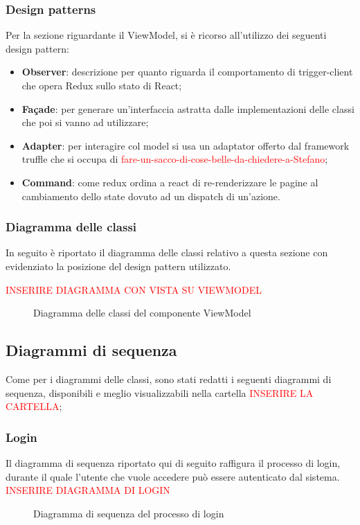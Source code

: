 		\subsubsection{Design patterns}
		Per la sezione riguardante il ViewModel, si è ricorso all'utilizzo dei seguenti design pattern:
			\begin{itemize}
				\item \textbf{Observer}: descrizione per quanto riguarda il comportamento di trigger-client che opera Redux sullo stato di React;
				\item \textbf{Façade}: per generare un'interfaccia astratta dalle implementazioni delle classi che poi si vanno ad utilizzare;
				\item \textbf{Adapter}: per interagire col model si usa un adaptator offerto dal framework truffle che si occupa di {\textcolor{red}{fare-un-sacco-di-cose-belle-da-chiedere-a-Stefano}};
				\item \textbf{Command}: come redux ordina a react di re-renderizzare le pagine al cambiamento dello state dovuto ad un dispatch di un'azione.
			\end{itemize}
	
		\subsubsection{Diagramma delle classi}
		In seguito è riportato il diagramma delle classi relativo a questa sezione con evidenziato la posizione del design pattern utilizzato.
	
	{\textcolor{red}{INSERIRE DIAGRAMMA CON VISTA SU VIEWMODEL}}
	\begin{figure}[h]
		\centering
		\caption{Diagramma delle classi del componente ViewModel}
		\label{}
	\end{figure}
	
	\subsection{Diagrammi di sequenza}
	Come per i diagrammi delle classi, sono stati redatti i seguenti diagrammi di sequenza, disponibili e meglio visualizzabili nella cartella {\textcolor{red}{INSERIRE LA CARTELLA}};
	
		\subsubsection{Login}
		Il diagramma di sequenza riportato qui di seguito raffigura il processo di login, durante il quale l'utente che vuole accedere può essere autenticato dal sistema.
		{\textcolor{red}{INSERIRE DIAGRAMMA DI LOGIN}}
		\begin{figure}[h]
			\centering
			\caption{Diagramma di sequenza del processo di login}
			\label{}
		\end{figure}
		
